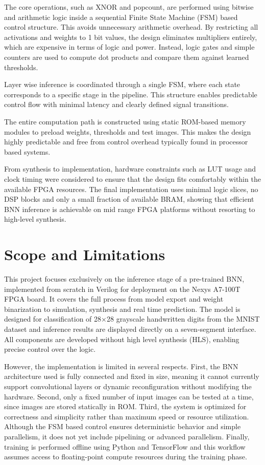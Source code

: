 \documentclass[a4paper,12pt]{report}
\begin{document}
The core operations, such as XNOR and popcount, are performed using bitwise and arithmetic logic inside a sequential Finite State Machine (FSM) based control structure. This avoids unnecessary arithmetic overhead. By restricting all activations and weights to 1 bit values, the design eliminates multipliers entirely, which are expensive in terms of logic and power. Instead, logic gates and simple counters are used to compute dot products and compare them against learned thresholds.

Layer wise inference is coordinated through a single FSM, where each state corresponds to a specific stage in the pipeline. This structure enables predictable control flow with minimal latency and clearly defined signal transitions.

The entire computation path is constructed using static ROM-based memory modules to preload weights, thresholds and test images. This makes the design highly predictable and free from control overhead typically found in processor based systems.

From synthesis to implementation, hardware constraints such as LUT usage and clock timing were considered to ensure that the design fits comfortably within the available FPGA resources. The final implementation uses minimal logic slices, no DSP blocks and only a small fraction of available BRAM, showing that efficient BNN inference is achievable on mid range FPGA platforms without resorting to high-level synthesis.


\section{Scope and Limitations}
This project focuses exclusively on the inference stage of a pre-trained BNN, implemented from scratch in Verilog for deployment on the Nexys A7-100T FPGA board. It covers the full process from model export and weight binarization to simulation, synthesis and real time prediction. The model is designed for classification of 28$\times$28 grayscale handwritten digits from the MNIST dataset and inference results are displayed directly on a seven-segment interface. All components are developed without high level synthesis (HLS), enabling precise control over the logic.

However, the implementation is limited in several respects. First, the BNN architecture used is fully connected and fixed in size, meaning it cannot currently support convolutional layers or dynamic reconfiguration without modifying the hardware. Second, only a fixed number of input images can be tested at a time, since images are stored statically in ROM. Third, the system is optimized for correctness and simplicity rather than maximum speed or resource utilization. Although the FSM based control ensures deterministic behavior and simple parallelism, it does not yet include pipelining or advanced parallelism. Finally, training is performed offline using Python and TensorFlow and this workflow assumes access to floating-point compute resources during the training phase.
\end{document}

